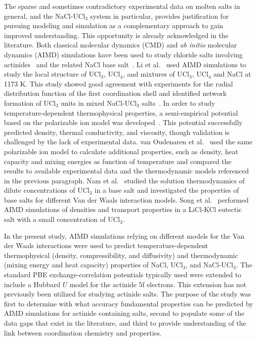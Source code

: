 \documentclass[preprint,3p,10pt,onecolumn,number,sort&compress]{elsarticle}
\begin{document}
The sparse and sometimes contradictory experimental data on molten salts in general, and the NaCl-UCl$_3$ system in particular, provides justification for pursuing modeling and simulation as a complementary approach to gain improved understanding. This opportunity is already acknowledged in the literature. Both classical molecular dynamics (CMD) and \textit{ab initio} molecular dynamics (AIMD) simulations have been used to study chloride salts involving actinides~\cite{Li,Li2020,Nam2015,SONG,VANOUDENAREN2021117470} and the related NaCl base salt~\cite{NGUYEN2021115262,LI2021100359,Tovey}. Li et al.~\cite{Li} used AIMD simulations to study the local structure of UCl$_3$, UCl$_4$, and mixtures of UCl$_3$, UCl$_4$ and NaCl at 1173 K. This study showed good agreement with experiments for the radial distribution function of the first coordination shell and identified network formation of UCl$_3$ units in mixed NaCl-UCl$_3$ salts~\cite{Li}.  
In order to study temperature-dependent thermophysical properties, a semi-empirical potential based on the polarizable ion model was developed~\cite{Li2020}. This potential successfully predicted density, thermal conductivity, and viscosity, though validation is challenged by the lack of experimental data. van Oudenaren et al.~\cite{VANOUDENAREN2021117470} used the same polarizable ion model to calculate additional properties, such as density, heat capacity and mixing energies as function of temperature and compared the results to available experimental data and the thermodynamic models referenced in the previous paragraph. 
Nam et al.~\cite{Nam2015} studied the solution thermodynamics of dilute concentrations of UCl$_3$ in a base salt and investigated the properties of base salts for different Van der Waals interaction models. Song et al.~\cite{SONG} performed AIMD simulations of densities and transport properties in a LiCl-KCl eutectic salt with a small concentration of UCl$_3$. 

In the present study, AIMD simulations relying on different models for the Van der Waals interactions were used to predict temperature-dependent thermophysical (density, compressibility, and diffusivity) and thermodynamic (mixing energy and heat capacity) properties of NaCl, UCl$_3$, and NaCl-UCl$_3$. The standard PBE exchange-correlation potentials typically used were extended to include a Hubbard $U$ model for the actinide 5f electrons. This extension has not previously been utilized for studying actinide salts. The purpose of the study was first to determine with what accuracy fundamental properties can be predicted by AIMD simulations for actinide containing salts, second to populate some of the data gaps that exist in the literature, and third to provide understanding of the link between coordination chemistry and properties. 
\end{document}
